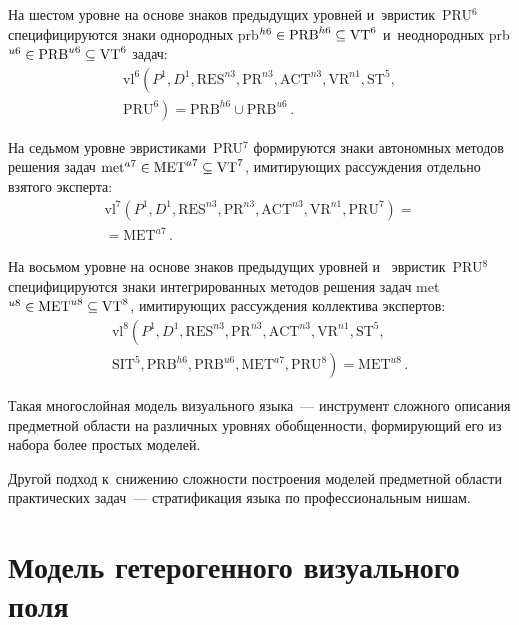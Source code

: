 \begin{multicols}{2}
  На шестом уровне на основе знаков предыдущих уровней 
и~эвристик~PRU$^6$ специфицируются знаки однородных prb$^{h6} \hm\in 
\mathrm{PRB}^{h6}\subseteq \mathrm{VT}^6$ и~неоднородных prb$^{u6}\hm\in \mathrm{PRB}^{u6}\subseteq 
\mathrm{VT}^6$ задач:
   \begin{multline*}
\mathrm{vl}^6\!\left( P^1, D^1, \mathrm{RES}^{n3}, \mathrm{PR}^{n3}, 
\mathrm{ACT}^{n3}, \mathrm{VR}^{n1}, \mathrm{ST}^5,\right.\\ 
\left.\mathrm{PRU}^6\right) = \mathrm{PRB}^{h6}\cup \mathrm{PRB}^{u6}\,.
  \end{multline*}
  
  На седьмом уровне эвристиками~PRU$^7$ формируются знаки автономных 
методов решения задач $\mathrm{met}^{a7}\hm\in \mathrm{MET}^{a7}\subseteq \mathrm{VT}^7$, 
имитирующих рассуждения отдельно взятого эксперта:
  \begin{multline*}
  \mathrm{vl}^7\!\left( P^1, D^1, \mathrm{RES}^{n3}, \mathrm{PR}^{n3}, 
  \mathrm{ACT}^{n3}, \mathrm{VR}^{n1}, \mathrm{PRU}^7\right) = {}\\
  {}=
\mathrm{MET}^{a7}\,.
  \end{multline*}
  
  На восьмом уровне на основе знаков предыдущих уровней и~
эвристик~PRU$^8$ специфицируются знаки интегрированных методов 
решения задач met$^{u8}\hm\in \mathrm{MET}^{u8}\subseteq \mathrm{VT}^8$, имитирующих 
рассуждения коллектива экспертов:
  \begin{multline*}
  \mathrm{vl}^8\!\left( P^1, D^1, \mathrm{RES}^{n3}, \mathrm{PR}^{n3},
  \mathrm{ACT}^{n3}, \mathrm{VR}^{n1}, \mathrm{ST}^5,\right.\\
\left.   \mathrm{SIT}^5, 
\mathrm{PRB}^{h6}, \mathrm{PRB}^{u6}, \mathrm{MET}^{a7}, \mathrm{PRU}^8\right)=
 \mathrm{MET}^{u8}\,.
  \end{multline*}
  
  Такая многослойная модель визуального языка~--- инструмент сложного 
описания предметной области на различных уровнях обобщенности, 
формирующий его из набора более простых моделей. 

Другой подход 
к~снижению сложности по\-стро\-ения моделей предметной области практических 
задач~--- стратификация языка по профессиональным нишам.
  
\section{Модель гетерогенного визуального поля}


\end{multicols}

